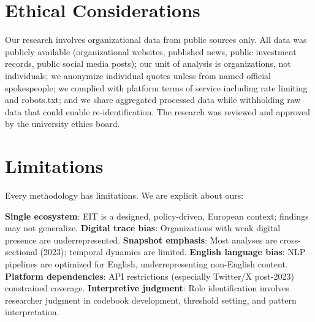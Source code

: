 \documentclass[../main.tex]{subfiles}
\begin{document}
\section{Ethical Considerations}

Our research involves organizational data from public sources only. All data was publicly available (organizational websites, published news, public investment records, public social media posts); our unit of analysis is organizations, not individuals; we anonymize individual quotes unless from named official spokespeople; we complied with platform terms of service including rate limiting and robots.txt; and we share aggregated processed data while withholding raw data that could enable re-identification. The research was reviewed and approved by the university ethics board.


\section{Limitations}

Every methodology has limitations. We are explicit about ours:

\begin{criticalbox}
\textbf{Single ecosystem}: EIT is a designed, policy-driven, European context; findings may not generalize. \textbf{Digital trace bias}: Organizations with weak digital presence are underrepresented. \textbf{Snapshot emphasis}: Most analyses are cross-sectional (2023); temporal dynamics are limited. \textbf{English language bias}: NLP pipelines are optimized for English, underrepresenting non-English content. \textbf{Platform dependencies}: API restrictions (especially Twitter/X post-2023) constrained coverage. \textbf{Interpretive judgment}: Role identification involves researcher judgment in codebook development, threshold setting, and pattern interpretation.
\end{criticalbox}%
\end{document}
